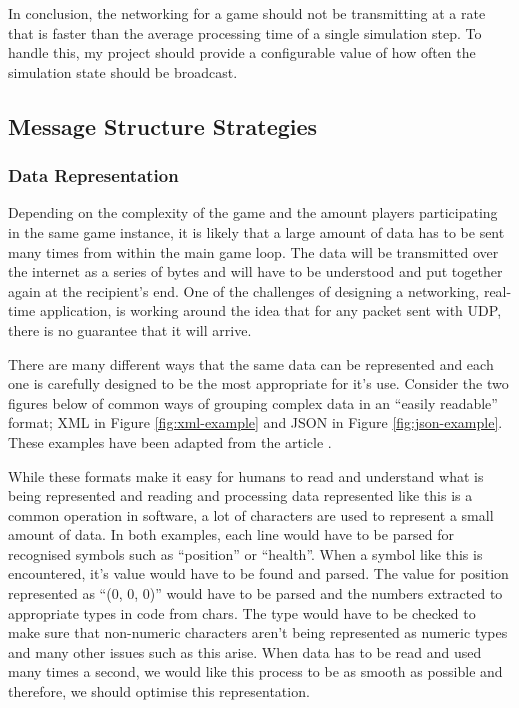 In conclusion, the networking for a game should not be transmitting at a rate that is faster than the average processing time of a single simulation step. To handle this, my project should provide a configurable value of how often the simulation state should be broadcast.


\subsection{Message Structure Strategies}
\subsubsection{Data Representation}
Depending on the complexity of the game and the amount players participating in the same game instance, it is likely that a large amount of data has to be sent many times from within the main game loop. The data will be transmitted over the internet as a series of bytes and will have to be understood and put together again at the recipient's end. One of the challenges of designing a networking, real-time application, is working around the idea that for any packet sent with UDP, there is no guarantee that it will arrive.

There are many different ways that the same data can be represented and each one is carefully designed to be the most appropriate for it's use. Consider the two figures below of common ways of grouping complex data in an ``easily readable'' format; XML in Figure \ref{fig:xml-example} and JSON in Figure \ref{fig:json-example}. These examples have been adapted from the article .

While these formats make it easy for humans to read and understand what is being represented and reading and processing data represented like this is a common operation in software, a lot of characters are used to represent a small amount of data. In both examples, each line would have to be parsed for recognised symbols such as ``position'' or ``health''. When a symbol like this is encountered, it's value would have to be found and parsed. The value for position represented as ``(0, 0, 0)'' would have to be parsed and the numbers extracted to appropriate types in code from chars. The type would have to be checked to make sure that non-numeric characters aren't being represented as numeric types and many other issues such as this arise. When data has to be read and used many times a second, we would like this process to be as smooth as possible and therefore, we should optimise this representation.

